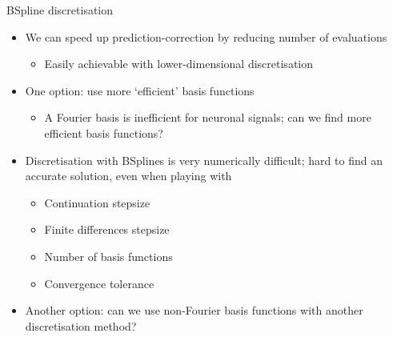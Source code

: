 \documentclass[presentation]{beamer}
\begin{document}
\begin{frame}[label={sec:orgd6e38b4}]{BSpline discretisation}
\begin{itemize}
\item We can speed up prediction-correction by reducing number of evaluations
\begin{itemize}
\item Easily achievable with lower-dimensional discretisation
\end{itemize}
\end{itemize}
\vfill
\begin{itemize}
\item One option: use more `efficient' basis functions
\begin{itemize}
\item A Fourier basis is inefficient for neuronal signals; can we find more efficient basis functions?
\end{itemize}
\end{itemize}
\vfill
\begin{itemize}
\item Discretisation with BSplines is very numerically difficult; hard to find an accurate solution, even when playing with
\begin{itemize}
\item Continuation stepsize
\item Finite differences stepsize
\item Number of basis functions
\item Convergence tolerance
\end{itemize}
\end{itemize}
\vfill
\begin{itemize}
\item Another option: can we use non-Fourier basis functions with another discretisation method?
\end{itemize}
\end{frame}
\end{document}
